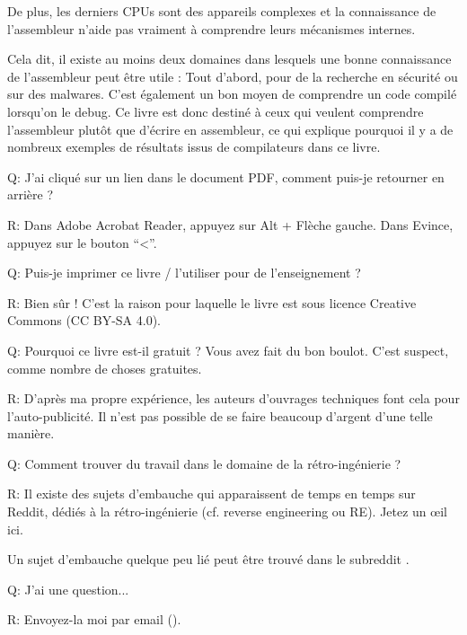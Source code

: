De plus, les derniers \ac{CPU}s sont des appareils complexes et la connaissance de l'assembleur n'aide pas vraiment à comprendre leurs mécanismes internes.

Cela dit, il existe au moins deux domaines dans lesquels une bonne connaissance de l'assembleur peut être utile : 
Tout d'abord, pour de la recherche en sécurité ou sur des malwares. C'est également un bon moyen de comprendre un code compilé lorsqu'on le debug.
Ce livre est donc destiné à ceux qui veulent comprendre l'assembleur plutôt que d'écrire en assembleur, ce qui explique pourquoi il y a de nombreux exemples de résultats issus de compilateurs dans ce livre. 

\par Q: J'ai cliqué sur un lien dans le document PDF, comment puis-je retourner en arrière ?
\par R: Dans Adobe Acrobat Reader, appuyez sur Alt + Flèche gauche. Dans Evince, appuyez sur le bouton ``<''.

\par Q: Puis-je imprimer ce livre / l'utiliser pour de l'enseignement ?
\par R: Bien sûr ! C'est la raison pour laquelle le livre est sous licence Creative Commons (CC BY-SA 4.0).

\par Q: Pourquoi ce livre est-il gratuit ? Vous avez fait du bon boulot. C'est suspect, comme nombre de choses gratuites.
\par R: D'après ma propre expérience, les auteurs d'ouvrages techniques font cela pour l'auto-publicité. Il n'est pas possible de se faire beaucoup d'argent d'une telle manière.

\par Q: Comment trouver du travail dans le domaine de la rétro-ingénierie ?
\par R: Il existe des sujets d'embauche qui apparaissent de temps en temps sur Reddit, dédiés à la rétro-ingénierie (cf. reverse engineering ou RE)\FNURLREDDIT{}.
Jetez un \oe{}il ici.

Un sujet d'embauche quelque peu lié peut être trouvé dans le subreddit .

\par Q: J'ai une question...
\par R: Envoyez-la moi par email (\EMAILS).

